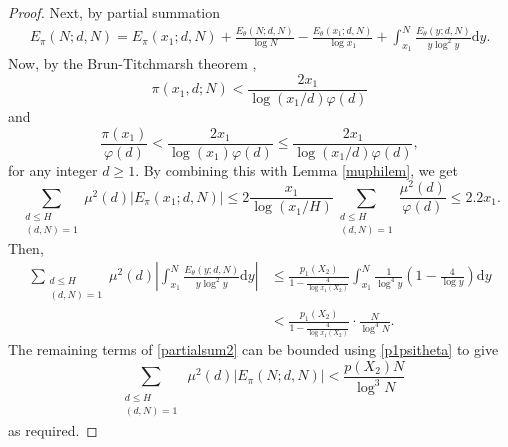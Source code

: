 \documentclass[12pt]{amsart}
\begin{document}
\begin{proof}
Next, by partial summation
\begin{align}\label{partialsum2}
    E_{\pi}(N;d,N) = E_{\pi}(x_1; d, N) + \frac{E_{\theta}(N; d, N)}{\log N} - \frac{E_{\theta}(x_1; d, N)}{\log x_1} + \int_{x_1}^{N} \frac{E_{\theta}(y; d, N)}{y \log^2 y} \mathrm{d}y.
\end{align}
Now, by the Brun-Titchmarsh theorem \cite[Theorem 2]{M-V}, $$\pi(x_1, d; N) < \frac{2x_1}{\log(x_1/d) \varphi(d)}$$ and $$\frac{\pi(x_1)}{\varphi(d)} < \frac{2x_1}{\log(x_1) \varphi(d)} \le \frac{2x_1}{\log(x_1/d)\varphi(d)},$$ 
for any integer $d \ge 1$. By combining this with Lemma \ref{muphilem}, we get
\begin{equation*}
    \sum_{\substack{d\le H\\(d,N)=1}}\mu^2(d)|E_{\pi}(x_1;d,N)|\le 2\frac{x_1}{\log(x_1/H)}\sum_{\substack{d\le H\\(d,N)=1}}\frac{\mu^2(d)}{\varphi(d)}\le 2.2x_1.
\end{equation*}
Then,
\begin{align*}
    \sum_{\substack{d\le H\\(d,N)=1}}\mu^2(d)\left|\int_{x_1}^{N} \frac{E_{\theta}(y; d, N)}{y \log^2 y} \mathrm{d}y\right|&\le\frac{p_1(X_2)}{1-\frac{4}{\log x_1(X_2)}}\int_{x_1}^N\frac{1}{\log^4y}\left(1-\frac{4}{\log y}\right)\mathrm{d}y\\
    &<\frac{p_1(X_2)}{1-\frac{4}{\log x_1(X_2)}}\cdot\frac{N}{\log^4 N}. 
\end{align*}
The remaining terms of \eqref{partialsum2} can be bounded using \eqref{p1psitheta} to give
\begin{equation*}
    \sum_{\substack{\substack{d\le H\\(d,N)=1}}}\mu^2(d)|E_{\pi}(N;d,N)|<\frac{p(X_2)N}{\log^3N}
\end{equation*}
as required.
\end{proof}
\end{document}
